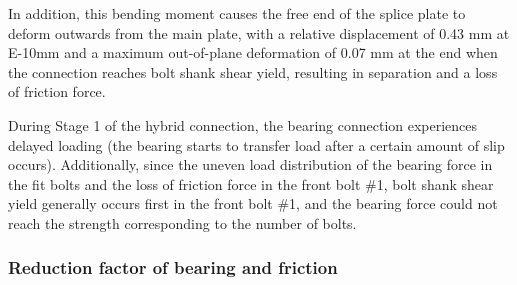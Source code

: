 In addition, this bending moment causes the free end of the splice plate to deform outwards from the main plate, with a relative displacement of 0.43 mm at E-10mm and a maximum out-of-plane deformation of 0.07 mm at the end when the connection reaches bolt shank shear yield, resulting in separation and a loss of friction force. 

During Stage 1 of the hybrid connection, the bearing connection experiences delayed loading (the bearing starts to transfer load after a certain amount of slip occurs). Additionally, since the uneven load distribution of the bearing force in the fit bolts and the loss of friction force in the front bolt \#1, bolt shank shear yield generally occurs first in the front bolt \#1, and the bearing force could not reach the strength corresponding to the number of bolts.





\subsubsection*{Reduction factor of bearing and friction}


